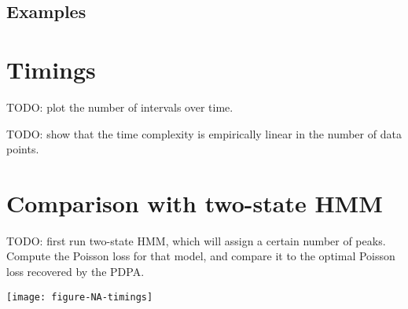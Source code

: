 \documentclass{article}
\begin{document}
\subsection{Examples}


\section{Timings}

TODO: plot the number of intervals over time.

TODO: show that the time complexity is empirically linear in the
number of data points.

\section{Comparison with two-state HMM}

TODO: first run two-state HMM, which will assign a certain number of
peaks. Compute the Poisson loss for that model, and compare it to the
optimal Poisson loss recovered by the PDPA.

\texttt{[image: figure-NA-timings]}



\end{document}
